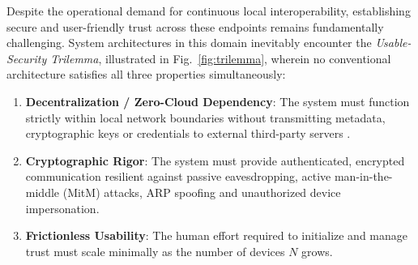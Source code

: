 \documentclass[conference,a4paper]{IEEEtran}
\begin{document}
Despite the operational demand for continuous local interoperability, establishing secure and user-friendly trust across these endpoints remains fundamentally challenging. System architectures in this domain inevitably encounter the \textit{Usable-Security Trilemma}, illustrated in Fig.~\ref{fig:trilemma}, wherein no conventional architecture satisfies all three properties simultaneously:
\begin{enumerate}
    \item \textbf{Decentralization / Zero-Cloud Dependency}: The system must function strictly within local network boundaries without transmitting metadata, cryptographic keys or credentials to external third-party servers \cite{kleppmann2019localfirst}.
    \item \textbf{Cryptographic Rigor}: The system must provide authenticated, encrypted communication resilient against passive eavesdropping, active man-in-the-middle (MitM) attacks, ARP spoofing and unauthorized device impersonation.
    \item \textbf{Frictionless Usability}: The human effort required to initialize and manage trust must scale minimally as the number of devices $N$ grows.
\end{enumerate}
\end{document}
